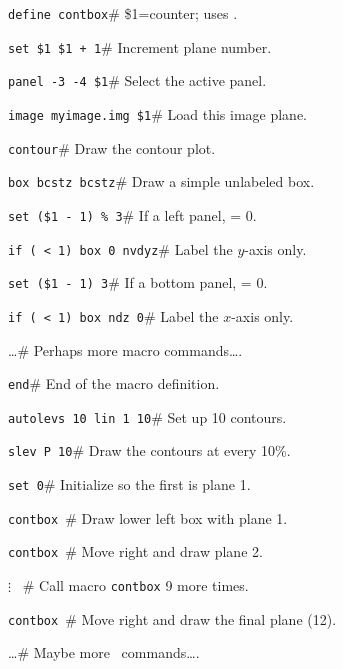 \begin{wiplist}%
  \item [\wipp] {\tt define contbox}\hfill\# \$1=counter; uses .
\samepage
  \item [\wipd] {\tt set \$1 \$1 + 1}\hfill\# Increment plane number.
  \item [\wipd] {\tt panel -3 -4 \$1}\hfill\# Select the active panel.
  \item [\wipd] {\tt image myimage.img \$1}\hfill\# Load this image plane.
  \item [\wipd] {\tt contour}\hfill\# Draw the contour plot.
  \item [\wipd] {\tt box bcstz bcstz}\hfill\# Draw a simple unlabeled box.
  \item [\wipd] {\tt set  (\$1 - 1) \% 3}\hfill\# If a left panel,
     = 0.
  \item [\wipd] {\tt if ( < 1) box 0 nvdyz}\hfill\# Label the
    $y$-axis only.
  \item [\wipd] {\tt set  (\$1 - 1) \esc{\,} 3}\hfill\# If a bottom
    panel,  = 0.
  \item [\wipd] {\tt if ( < 1) box ndz 0}\hfill\# Label the
    $x$-axis only.
  \item [\wipd] \ldots\hfill\# Perhaps more macro commands\ldots.
  \item [\wipd] {\tt end}\hfill\# End of the macro definition.
  \item [\wipp] {\tt autolevs 10 lin 1 10}\hfill\# Set up 10 contours.
  \item [\wipp] {\tt slev P 10}\hfill\# Draw the contours at every 10\%.
  \item [\wipp] {\tt set  0}\hfill\# Initialize so the first is plane 1.
  \item [\wipp] {\tt contbox }\hfill\# Draw lower left box with plane 1.
  \item [\wipp] {\tt contbox }\hfill\# Move right and draw plane 2.
  \item [$\vdots$] \ \hfill\# Call macro {\tt contbox} 9 more times.
  \item [\wipp] {\tt contbox }\hfill\# Move right and draw
    the final plane (12).
  \item [\wipp] \ldots\hfill\# Maybe more \wip\ commands\ldots.
\end{wiplist}

